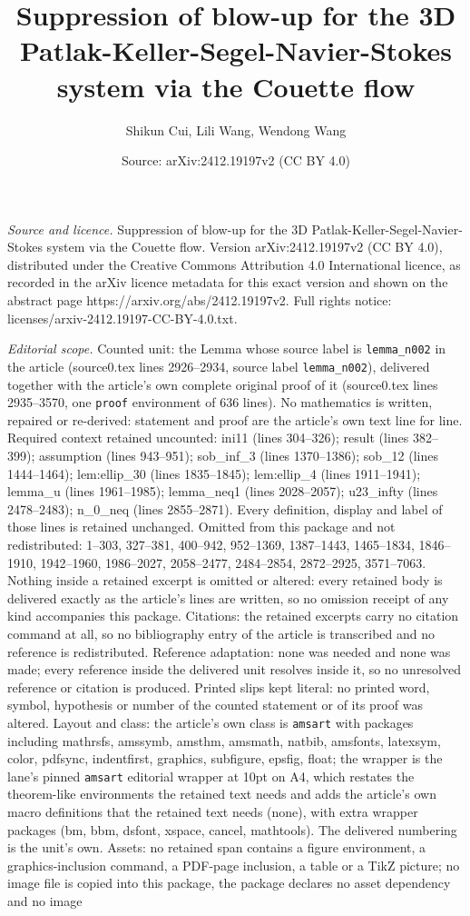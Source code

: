 \documentclass[10pt,a4paper]{amsart}
\title[Suppression of blow-up for the 3D Patlak-Keller-Segel-Navier]{Suppression of blow-up for the 3D Patlak-Keller-Segel-Navier-Stokes system via the Couette flow}
\author{Shikun Cui, Lili Wang, Wendong Wang}
\date{Source: arXiv:2412.19197v2 (CC BY 4.0)}
\begin{document}
\maketitle

\noindent\emph{Source and licence.} Suppression of blow-up for the 3D Patlak-Keller-Segel-Navier-Stokes system via the Couette flow. Version arXiv:2412.19197v2 (CC BY 4.0), distributed under the Creative Commons Attribution 4.0 International licence, as recorded in the arXiv licence metadata for this exact version and shown on the abstract page https://arxiv.org/abs/2412.19197v2. Full rights notice: licenses/arxiv-2412.19197-CC-BY-4.0.txt.\par\smallskip

\noindent\textit{Editorial scope.} Counted unit: the Lemma whose source label is \texttt{lemma\_n002} in the article (source0.tex lines 2926--2934, source label \texttt{lemma\_n002}), delivered together with the article's own complete original proof of it (source0.tex lines 2935--3570, one \texttt{proof} environment of 636 lines). No mathematics is written, repaired or re-derived: statement and proof are the article's own text line for line. Required context retained uncounted: ini11 (lines 304--326); result (lines 382--399); assumption (lines 943--951); sob\_inf\_3 (lines 1370--1386); sob\_12 (lines 1444--1464); lem:ellip\_30 (lines 1835--1845); lem:ellip\_4 (lines 1911--1941); lemma\_u (lines 1961--1985); lemma\_neq1 (lines 2028--2057); u23\_infty (lines 2478--2483); n\_0\_neq (lines 2855--2871). Every definition, display and label of those lines is retained unchanged. Omitted from this package and not redistributed: 1--303, 327--381, 400--942, 952--1369, 1387--1443, 1465--1834, 1846--1910, 1942--1960, 1986--2027, 2058--2477, 2484--2854, 2872--2925, 3571--7063. Nothing inside a retained excerpt is omitted or altered: every retained body is delivered exactly as the article's lines are written, so no omission receipt of any kind accompanies this package. Citations: the retained excerpts carry no citation command at all, so no bibliography entry of the article is transcribed and no reference is redistributed. Reference adaptation: none was needed and none was made; every reference inside the delivered unit resolves inside it, so no unresolved reference or citation is produced. Printed slips kept literal: no printed word, symbol, hypothesis or number of the counted statement or of its proof was altered. Layout and class: the article's own class is \texttt{amsart} with packages including mathrsfs, amssymb, amsthm, amsmath, natbib, amsfonts, latexsym, color, pdfsync, indentfirst, graphics, subfigure, epsfig, float; the wrapper is the lane's pinned \texttt{amsart} editorial wrapper at 10pt on A4, which restates the theorem-like environments the retained text needs and adds the article's own macro definitions that the retained text needs (none), with extra wrapper packages (bm, bbm, dsfont, xspace, cancel, mathtools). The delivered numbering is the unit's own. Assets: no retained span contains a figure environment, a graphics-inclusion command, a PDF-page inclusion, a table or a TikZ picture; no image file is copied into this package, the package declares no asset dependency and no image 
\end{document}

